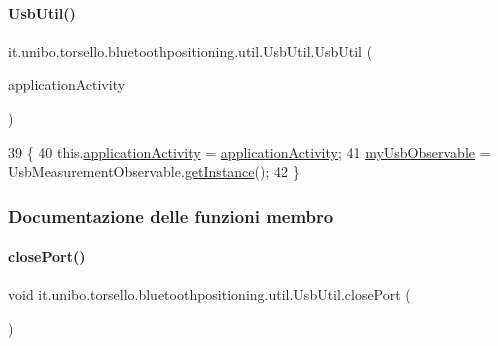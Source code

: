 \paragraph{\texorpdfstring{Usb\+Util()}{UsbUtil()}}
{\footnotesize\ttfamily it.\+unibo.\+torsello.\+bluetoothpositioning.\+util.\+Usb\+Util.\+Usb\+Util (\begin{DoxyParamCaption}\item[{\hyperlink{classit_1_1unibo_1_1torsello_1_1bluetoothpositioning_1_1activities_1_1ApplicationActivity}{Application\+Activity}}]{application\+Activity }\end{DoxyParamCaption})}


\begin{DoxyCode}
39                                                             \{
40         this.\hyperlink{classit_1_1unibo_1_1torsello_1_1bluetoothpositioning_1_1util_1_1UsbUtil_afdcd78c04f043fafe29eb2cc006b5843_afdcd78c04f043fafe29eb2cc006b5843}{applicationActivity} = \hyperlink{classit_1_1unibo_1_1torsello_1_1bluetoothpositioning_1_1util_1_1UsbUtil_afdcd78c04f043fafe29eb2cc006b5843_afdcd78c04f043fafe29eb2cc006b5843}{applicationActivity};
41         \hyperlink{classit_1_1unibo_1_1torsello_1_1bluetoothpositioning_1_1util_1_1UsbUtil_a1c500d0f1a3f3a11b16015acc49929e0_a1c500d0f1a3f3a11b16015acc49929e0}{myUsbObservable} = UsbMeasurementObservable.\hyperlink{classit_1_1unibo_1_1torsello_1_1bluetoothpositioning_1_1observables_1_1UsbMeasurementObservable_aff4f89490f3f2c11ca4feea933d12d88_aff4f89490f3f2c11ca4feea933d12d88}{getInstance}();
42     \}
\end{DoxyCode}


\subsubsection{Documentazione delle funzioni membro}
\hypertarget{classit_1_1unibo_1_1torsello_1_1bluetoothpositioning_1_1util_1_1UsbUtil_acfc389f97d1eae6eabe803bf16b49f7d_acfc389f97d1eae6eabe803bf16b49f7d}{}\label{classit_1_1unibo_1_1torsello_1_1bluetoothpositioning_1_1util_1_1UsbUtil_acfc389f97d1eae6eabe803bf16b49f7d_acfc389f97d1eae6eabe803bf16b49f7d} 
\paragraph{\texorpdfstring{close\+Port()}{closePort()}}
{\footnotesize\ttfamily void it.\+unibo.\+torsello.\+bluetoothpositioning.\+util.\+Usb\+Util.\+close\+Port (\begin{DoxyParamCaption}{ }\end{DoxyParamCaption})\hspace{0.3cm}{\ttfamily [private]}}


